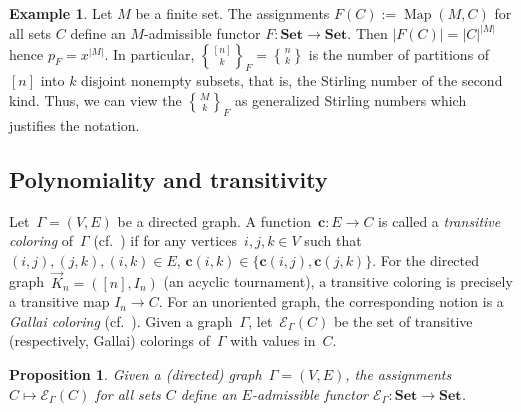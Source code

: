 \documentclass[12pt, reqno]{amsart}
\newcommand{\tstirling}[2]{\genfrac{\{}{\}}{0pt}1{#1}{#2}}
\newtheorem{proposition}[theorem]{Proposition}
\theoremstyle{definition}
\newtheorem{example}[theorem]{Example}
\numberwithin{equation}{section}
\DeclareMathOperator{\Map}{Map}
\newcommand{\EE}{{\mathcal{E}}}
\begin{document}
\begin{example}\label{example:ordinary Stirling number} Let $M$ be a finite set. The assignments $F(C):=\Map(M,C)$ for all sets $C$ define an $M$-admissible functor $F:\mathbf{Set}\to \mathbf{Set}$.
Then $|F(C)|=|C|^{|M|}$ hence $p_F=x^{|M|}$. In particular, $\tstirling{[n]}{k}_F=\tstirling{n}{k}$ is the number of partitions of $[n]$ into $k$ disjoint nonempty subsets, that is, the Stirling number of the second kind. 
Thus, we can view the $\tstirling{M}{k}_F$ as  generalized Stirling numbers which justifies the notation.
\end{example}

\subsection{Polynomiality and transitivity}\label{subs:pol trans}
Let~$\Gamma=(V,E)$ be a directed graph. A function~$\mathbf c:E\to C$ is called a {\em transitive coloring} of~$\Gamma$ (cf.~\cite{ABGJ}) if for any vertices~$i,j,k\in V$ such that $(i,j),(j,k),(i,k)\in E$,
$\mathbf c(i,k)\in\{\mathbf c(i,j),\mathbf c(j,k)\}$.
For the directed graph~$\vec K_n=([n],I_n)$ (an acyclic tournament),
a transitive coloring is precisely a transitive map
$I_n\to C$. 
For an unoriented graph, the corresponding notion is a {\em Gallai coloring} (cf.~\cite{ABGJ}). Given a graph~$\Gamma$, 
let~$\EE_\Gamma(C)$ be the set of transitive (respectively, Gallai) colorings of~$\Gamma$ with values in~$C$.

\begin{proposition} \label{prop:EGamma is an M admissible functor}
Given a (directed) graph~$\Gamma=(V,E)$, the assignments $C\mapsto \EE_{\Gamma}(C)$ for all sets $C$ define an $E$-admissible functor $\EE_{\Gamma}: \mathbf{Set}\to \mathbf{Set}$.
\end{proposition}
\end{document}
